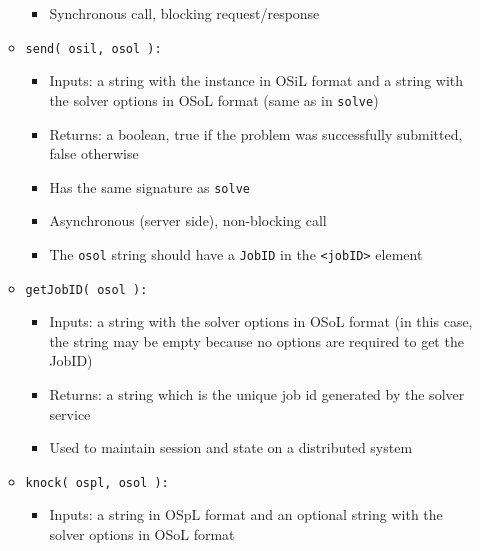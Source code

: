 \documentclass[11pt]{article}
\renewcommand{\_}{{\char"5F}}
\renewcommand{\{}{{\char"7B}}
\renewcommand{\}}{{\char"7D}}
\renewcommand{\^}{{\char"0D}}
\renewcommand{\'}{{\char"0D}}
\begin{document}
\begin{enumerate}[Step 1:]
\begin{itemize}
\begin{itemize}
\item Synchronous call, blocking request/response

\end{itemize}



\item {\tt send( osil, osol ):}

\begin{itemize}

\item Inputs: a string with the instance in OSiL format and a string with the solver options
in OSoL format (same as in {\tt solve})

\item Returns:  a boolean, true if the problem was successfully submitted, false otherwise

\item Has the same signature as {\tt solve}

\item Asynchronous (server side), non-blocking call

\item The {\tt osol} string should have a {\tt JobID} in the {\tt <jobID>} element
\end{itemize}


\item {\tt getJobID( osol ):}

\begin{itemize}

\item Inputs: a string  with the solver options in OSoL format (in this case, the string
may be empty because no options are required to get the JobID)

\item Returns: a string which is the unique job id generated by the solver service

\item Used to maintain session and state on a distributed system
\end{itemize}



\item {\tt knock( ospl, osol ):}

\begin{itemize}

\item Inputs: a string in OSpL format and an optional string with the solver options in OSoL format


\end{itemize}
\end{itemize}
\end{enumerate}
\end{document}
